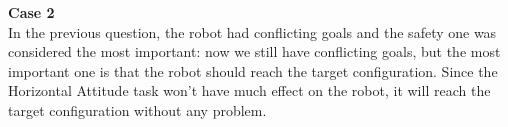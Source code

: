 \documentclass{article}
\begin{document}
{\large \textbf{Case 2}} \\
In the previous question, the robot had conflicting goals and the safety one was considered the most important: now we still have conflicting goals, but the most important one is that the robot should reach the target configuration. Since the Horizontal Attitude task won't have much effect on the robot, it will reach the target configuration without any problem.
\begin{figure}[H]
	\centering
	\hspace{10mm}
	\label{fig:q3case2ab}
\end{figure}
\end{document}

